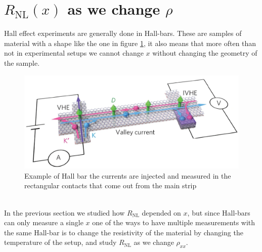 \section{$R_{\textrm{NL}}(x)$ as we change $\rho$}
Hall effect experiments are generally done in Hall-bars. These are samples of material with a shape like the one in figure \ref{fig:hall-bar}, it also means that more often than not in experimental setups we cannot change $x$ without changing the geometry of the sample.
\begin{figure}[h!]
    \centering
    \includegraphics[width=\linewidth]{Immagini/rnl/hallbarbrutta.png}
    \caption{Example of Hall bar the currents are injected and measured in the rectangular contacts that come out from the main strip}
    \label{fig:hall-bar}
\end{figure}\\
In the previous section we studied how $R_{\textrm{NL}}$ depended on $x$, but since Hall-bars can only measure a single $x$ one of the ways to have multiple measurements with the same Hall-bar is to change the resistivity of the material by changing the temperature of the setup, and study $R_{\textrm{NL}}$ as we change $\rho_{xx}$.


